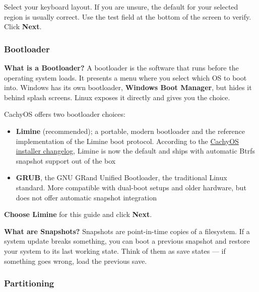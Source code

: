 \documentclass{article}
\begin{document}
Select your keyboard layout. If you are unsure, the default for your selected region
is usually correct. Use the test field at the bottom of the screen to verify. Click
\textbf{Next}.

\subsubsection{Bootloader}

\begin{callout}{\textbf{What is a Bootloader?}}
  A bootloader is the software that runs before the operating system loads. It
  presents a menu where you select which OS to boot into. Windows has its own
  bootloader, \textbf{Windows Boot Manager}, but hides it behind splash
  screens. Linux exposes it directly and gives you the choice.
\end{callout}

\vspace{0.5em}

CachyOS offers two bootloader choices:

\begin{itemize}[leftmargin=1.5em, label={\tiny\textbullet}, nosep]
  \item \textbf{Limine} (recommended); a portable, modern bootloader and the
    reference implementation of the Limine boot protocol. According to the
    \href{https://wiki.cachyos.org/cachyos_basic/changelogs/gui_installer/}{CachyOS
    installer changelog}, Limine is now the default and ships with automatic Btrfs
    snapshot support out of the box
  \item \textbf{GRUB}, the GNU GRand Unified Bootloader, the traditional Linux
    standard. More compatible with dual-boot setups and older hardware, but does not
    offer automatic snapshot integration
\end{itemize}

\textbf{Choose Limine} for this guide and click \textbf{Next}.

\begin{callout}{\textbf{What are Snapshots?}}
  Snapshots are point-in-time copies of a filesystem. If a system update breaks
  something, you can boot a previous snapshot and restore your system to its last
  working state. Think of them as save states --- if something goes wrong, load the
  previous save.
\end{callout}

\subsubsection{Partitioning}
\end{document}

